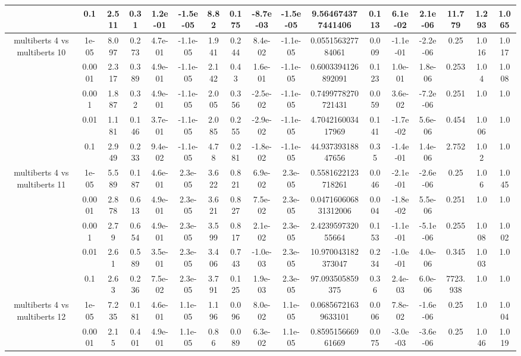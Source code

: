 \begin{tabular}{|c|c|c|c|c|c|c|c|c|c|c|c|c|c|c|c|c|}
 & 0.1 & 2.511 & 0.31 & 1.2e-01 & -1.5e-05 & 8.82 & 0.175 & -8.7e-03 & -1.5e-05 & 9.564674377441406 & 0.113 & 6.1e-02 & 2.1e-06 & 11.779 & 1.293 & 1.065 \\
\hline
\multirow{5}{*}{multiberts 4 vs multiberts 10} & 1e-05 & 8.097 & 0.273 & 4.7e-01 & -1.1e-05 & 1.941 & 0.244 & 8.4e-02 & -1.1e-05 & 0.055156327784061 & 0.009 & -1.1e-01 & -2.2e-06 & 0.25 & 1.016 & 1.017 \\
 & 0.0001 & 2.317 & 0.389 & 4.9e-01 & -1.1e-05 & 2.142 & 0.43 & 1.6e-01 & -1.1e-05 & 0.6003394126892091 & 0.123 & 1.0e-01 & 1.8e-06 & 0.253 & 1.04 & 1.008 \\
 & 0.001 & 1.887 & 0.32 & 4.9e-01 & -1.1e-05 & 2.005 & 0.356 & -2.5e-02 & -1.1e-05 & 0.7499778270721431 & 0.059 & 3.6e-02 & -7.2e-06 & 0.251 & 1.0 & 1.0 \\
 & 0.01 & 1.181 & 0.146 & 3.7e-01 & -1.1e-05 & 2.085 & 0.255 & -2.9e-02 & -1.1e-05 & 4.704216003417969 & 0.141 & -1.7e-02 & 5.6e-06 & 0.454 & 1.006 & 1.0 \\
 & 0.1 & 2.949 & 0.233 & 9.4e-02 & -1.1e-05 & 4.78 & 0.281 & -1.8e-02 & -1.1e-05 & 44.93739318847656 & 0.35 & -1.4e-01 & 1.4e-06 & 2.752 & 1.02 & 1.0 \\
\hline
\multirow{5}{*}{multiberts 4 vs multiberts 11} & 1e-05 & 5.589 & 0.187 & 4.6e-01 & 2.3e-05 & 3.622 & 0.821 & 6.9e-02 & 2.3e-05 & 0.5581622123718261 & 0.046 & -2.1e-01 & -2.6e-06 & 0.25 & 1.06 & 1.045 \\
 & 0.0001 & 2.878 & 0.613 & 4.9e-01 & 2.3e-05 & 3.621 & 0.827 & 7.5e-02 & 2.3e-05 & 0.047160606831312006 & 0.004 & -1.8e-02 & 5.5e-06 & 0.251 & 1.0 & 1.0 \\
 & 0.001 & 2.79 & 0.654 & 4.9e-01 & 2.3e-05 & 3.599 & 0.817 & 2.1e-02 & 2.3e-05 & 2.423959732055664 & 0.153 & -1.1e-01 & -5.1e-06 & 0.255 & 1.008 & 1.002 \\
 & 0.01 & 2.61 & 0.589 & 3.5e-01 & 2.3e-05 & 3.406 & 0.743 & -1.0e-03 & 2.3e-05 & 10.970043182373047 & 0.234 & -1.0e-01 & 4.0e-06 & 0.345 & 1.003 & 1.0 \\
 & 0.1 & 2.63 & 0.236 & 7.5e-02 & 2.3e-05 & 3.791 & 0.125 & 1.9e-03 & 2.3e-05 & 97.093505859375 & 0.36 & 2.4e-03 & 6.0e-06 & 7723.938 & 1.0 & 1.0 \\
\hline
\multirow{5}{*}{multiberts 4 vs multiberts 12} & 1e-05 & 7.235 & 0.181 & 4.6e-01 & 1.1e-05 & 1.196 & 0.096 & 8.0e-02 & 1.1e-05 & 0.06856721639633101 & 0.006 & 7.8e-02 & -1.6e-06 & 0.25 & 1.0 & 1.004 \\
 & 0.0001 & 2.15 & 0.401 & 4.9e-01 & 1.1e-05 & 0.86 & 0.089 & 6.3e-02 & 1.1e-05 & 0.859515666961669 & 0.075 & -3.0e-03 & -3.6e-06 & 0.25 & 1.046 & 1.019 \\

\end{tabular}
